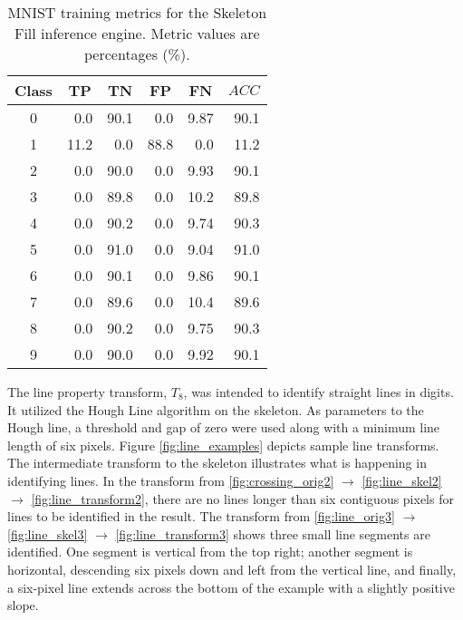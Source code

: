 \begin{table}[H]
    \renewcommand{\arraystretch}{1.3}
    \caption{MNIST training metrics for the Skeleton Fill inference engine. Metric values are percentages (\%).}
    \begin{center}
    \begin{tabular}{| c | r | r | r | r | r |}
        \hline
        Class & \multicolumn{1}{|c|}{TP} & \multicolumn{1}{|c|}{TN} & \multicolumn{1}{|c|}{FP} & \multicolumn{1}{|c|}{FN} & \multicolumn{1}{|c|}{$ACC$} \\
        \hline
        \hline
        0 & 0.0 & 90.1 & 0.0 & 9.87 & 90.1 \\ \hline
        1 & 11.2 & 0.0 & 88.8 & 0.0 & 11.2 \\ \hline
        2 & 0.0 & 90.0 & 0.0 & 9.93 & 90.1 \\ \hline
        3 & 0.0 & 89.8 & 0.0 & 10.2 & 89.8 \\ \hline
        4 & 0.0 & 90.2 & 0.0 & 9.74 & 90.3 \\ \hline
        5 & 0.0 & 91.0 & 0.0 & 9.04 & 91.0 \\ \hline
        6 & 0.0 & 90.1 & 0.0 & 9.86 & 90.1 \\ \hline
        7 & 0.0 & 89.6 & 0.0 & 10.4 & 89.6 \\ \hline
        8 & 0.0 & 90.2 & 0.0 & 9.75 & 90.3 \\ \hline
        9 & 0.0 & 90.0 & 0.0 & 9.92 & 90.1 \\
        \hline
    \end{tabular}
    \end{center}
    \label{tab:skel_fill_metrics}
\end{table}

The line property transform, $T_8$, was intended to identify straight lines in
digits. It utilized the Hough Line algorithm on the skeleton. As parameters to
the Hough line, a threshold and gap of zero were used along with a minimum line
length of six pixels. Figure \ref{fig:line_examples} depicts sample line
transforms. The intermediate transform to the skeleton illustrates what is
happening in identifying lines. In the transform from \ref{fig:crossing_orig2}
$\rightarrow$ \ref{fig:line_skel2} $\rightarrow$ \ref{fig:line_transform2},
there are no lines longer than six contiguous pixels for lines to be identified
in the result. The transform from \ref{fig:line_orig3} $\rightarrow$
\ref{fig:line_skel3} $\rightarrow$ \ref{fig:line_transform3} shows three small
line segments are identified. One segment is vertical from the top right;
another segment is horizontal, descending six pixels down and left from the
vertical line, and finally, a six-pixel line extends across the bottom of the
example with a slightly positive slope.

